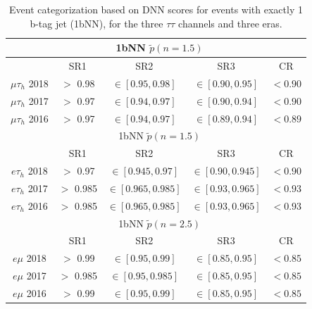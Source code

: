 \begin{table}[h!]
    \begin{center}
       \begin{tabular}{|c|c|c|c|c|}
       \hline
        & \multicolumn{3}{c}{1bNN $\tilde{p}(n=1.5)$} & \\
       \hline
        & SR1 & SR2 & SR3 & CR \\
       \hline
       $\mu\tau_{h}$ 2018 & $>$ 0.98 & $\in[0.95,0.98]$ & $\in[0.90, 0.95]$ & $<0.90$ \\
       $\mu\tau_{h}$ 2017 & $>$ 0.97 & $\in[0.94,0.97]$ & $\in[0.90, 0.94]$ & $<0.90$ \\
       $\mu\tau_{h}$ 2016 & $>$ 0.97 & $\in[0.94,0.97]$ & $\in[0.89, 0.94]$ & $<0.89$ \\
       \hline
       \hline
        & \multicolumn{3}{c}{1bNN $\tilde{p}(n=1.5)$} & \\
       \hline
        & SR1 & SR2 & SR3 & CR \\
       \hline
       $e\tau_{h}$ 2018 & $>$ 0.97 & $\in[0.945,0.97]$ & $\in[0.90, 0.945]$ & $<0.90$ \\
       $e\tau_{h}$ 2017 & $>$ 0.985 & $\in[0.965,0.985]$ & $\in[0.93, 0.965]$ & $<0.93$ \\
       $e\tau_{h}$ 2016 & $>$ 0.985 & $\in[0.965,0.985]$ & $\in[0.93, 0.965]$ & $<0.93$ \\
       \hline
       \hline
        & \multicolumn{3}{c}{1bNN $\tilde{p}(n=2.5)$} & \\
       \hline
        & SR1 & SR2 & SR3 & CR \\
       \hline
       $e\mu$ 2018 & $>$ 0.99 & $\in[0.95,0.99]$ & $\in[0.85, 0.95]$ & $<0.85$ \\
       $e\mu$ 2017 & $>$ 0.985 & $\in[0.95,0.985]$ & $\in[0.85, 0.95]$ & $<0.85$ \\
       $e\mu$ 2016 & $>$ 0.99 & $\in[0.95,0.99]$ & $\in[0.85, 0.95]$ & $<0.85$ \\
       \hline
      \end{tabular}
    \end{center}
    \caption{Event categorization based on DNN scores for events with exactly 1 b-tag jet (1bNN), for the three $\tau\tau$ channels and three eras.}
    \label{table:1bNN-final-categories}
\end{table}


